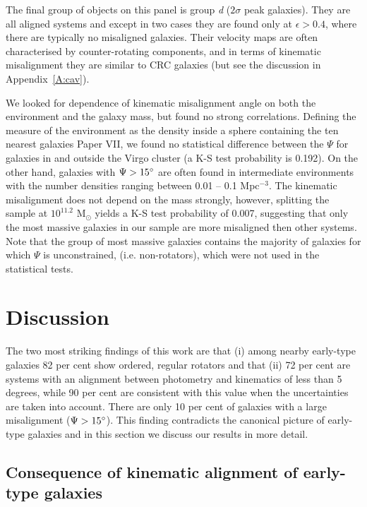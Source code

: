 \documentclass[usenatbib,usegraphicx]{mn2e}
\begin{document}
The final group of objects on this panel is group {\it d} ($2\sigma$ peak galaxies). They are all aligned systems and except in two cases they are found only at $\epsilon> 0.4$, where there are typically no misaligned galaxies. Their velocity maps are often characterised by counter-rotating components, and in terms of kinematic misalignment they are similar to CRC galaxies (but see the discussion in Appendix~\ref{A:cav}). 

We looked for dependence of kinematic misalignment angle on both the environment and the galaxy mass, but found no strong correlations. Defining the measure of the environment as the density inside a sphere containing the ten nearest galaxies Paper VII, we found no statistical difference between the $\Psi$ for galaxies in and outside the Virgo cluster (a K-S test probability is 0.192). On the other hand, galaxies with $\Psi>15\hbox{$^\circ$}$ are often found in intermediate environments with the number densities ranging between 0.01 -- 0.1 Mpc$^{-3}$. The kinematic misalignment does not depend on the mass strongly, however, splitting the sample at  $10^{11.2}$ M$_\odot$ yields a K-S test probability of 0.007, suggesting that only the most massive galaxies in our sample are more misaligned then other systems. Note that the group of most massive galaxies contains the majority of galaxies for which $\Psi$ is unconstrained, (i.e. non-rotators), which were not used in the statistical tests.


%
%
\section{Discussion}
\label{s:discuss}


The two most striking findings of this work are that (i) among nearby early-type galaxies 82 per cent show ordered, regular rotators and that (ii) 72 per cent are systems with an alignment between photometry and kinematics of less than 5 degrees, while 90 per cent are consistent with this value when the uncertainties are taken into account. There are only 10 per cent of galaxies with a large misalignment ($\Psi > 15\hbox{$^\circ$}$). This finding contradicts the canonical picture of early-type galaxies and in this section we discuss our results in more detail. 


\subsection{Consequence of kinematic alignment of early-type galaxies}
\label{ss:align}
\end{document}
